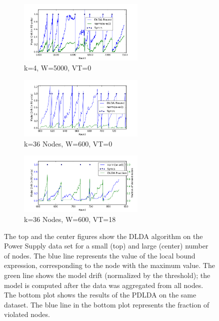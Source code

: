 \begin{figure}[ht!]
    \centering
    \begin{subfigure}[b]{0.5\textwidth}
        \includegraphics[width=\textwidth,height=3cm]{PowerSupply/4nodes.png}
        \caption{k=4, W=5000, VT=0}
    \end{subfigure}

    \begin{subfigure}[b]{0.5\textwidth}
        \includegraphics[width=\textwidth,height=3cm]{PowerSupply/36nodes.png}
        \caption{k=36 Nodes, W=600, VT=0}
    \end{subfigure}

    \begin{subfigure}[b]{0.5\textwidth}
        \includegraphics[width=\textwidth,height=3cm]{PowerSupply/36nodesProb.png}
        \caption{k=36 Nodes, W=600, VT=18}
    \end{subfigure}
    \caption{The top and the center figures show the DLDA algorithm on the Power Supply data set for a small (top) and large (center) number of nodes. The blue line represents the value of the local bound expression, corresponding to the node with the maximum value. The green line shows the model drift (normalized by the threshold); the model is computed after the data was aggregated from all nodes. The bottom plot shows the results of the PDLDA on the same dataset. The blue line in the bottom plot represents the fraction of violated nodes.}\label{PowerSupplyFigures}
\end{figure}

